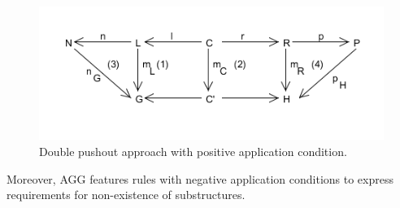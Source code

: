 \begin{figure}[H]
	\centering
	\includegraphics[scale=0.7]{./Figures/Double_Pushout_PAC.png}
	\caption[The Double Pushout approach with PAC]
	{Double pushout approach with positive application condition.}
	\label{fig:DPO_NAC}
\end{figure}


Moreover, AGG features rules with negative application conditions to express
requirements for non-existence of substructures.





